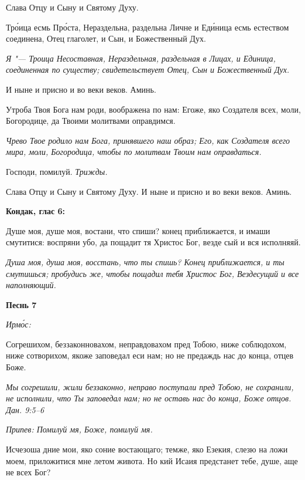 Слава Отцу и Сыну и Святому Духу.


Тро́ица есмь Про́ста, Нераздельна, раздельна Личне и Еди́ница есмь естеством соединена, Отец глаголет, и Сын, и Божественный Дух.


\itshape Я "--- Троица Несоставная, Нераздельная, раздельная в Лицах, и Единица, соединенная по существу; свидетельствует Отец, Сын и Божественный Дух.\normalfont{}


И ныне и присно и во веки веков. Аминь.


Утроба Твоя Бога нам роди, воображена по нам: Егоже, яко Создателя всех, моли, Богородице, да Твоими молитвами оправдимся.


\itshape Чрево Твое родило нам Бога, принявшего наш образ; Его, как Создателя всего мира, моли, Богородица, чтобы по молитвам Твоим нам оправдаться.\normalfont{}


Господи, помилуй. \itshape Трижды.\normalfont{}


Слава Отцу и Сыну и Святому Духу. И ныне и присно и во веки веков. Аминь.





\bfseries Кондак, глас 6:\normalfont{}


Душе моя, душе моя, востани, что спиши? конец приближается, и имаши смутитися: воспряни убо, да пощадит тя Христос Бог, везде сый и вся исполняяй.


\itshape Душа моя, душа моя, восстань, что ты спишь? Конец приближается, и ты смутишься; пробудись же, чтобы пощадил тебя Христос Бог, Вездесущий и все наполняющий.\normalfont{}





\bfseries Песнь 7\normalfont{}


\itshape Ирмо́с:\normalfont{}


Согрешихом, беззаконновахом, неправдовахом пред Тобою, ниже соблюдохом, ниже сотворихом, якоже заповедал еси нам; но не предаждь нас до конца, отцев Боже.


\itshape Мы согрешили, жили беззаконно, неправо поступали пред Тобою, не сохранили, не исполнили, что Ты заповедал нам; но не оставь нас до конца, Боже отцов. Дан. 9:5–6\normalfont{}


\itshape Припев:\normalfont{} Помилуй мя, Боже, помилуй мя.


Исчезоша дние мои, яко соние востающаго; темже, яко Езекия, слезю на ложи моем, приложитися мне летом живота. Но кий Исаия предстанет тебе, душе, аще не всех Бог?


